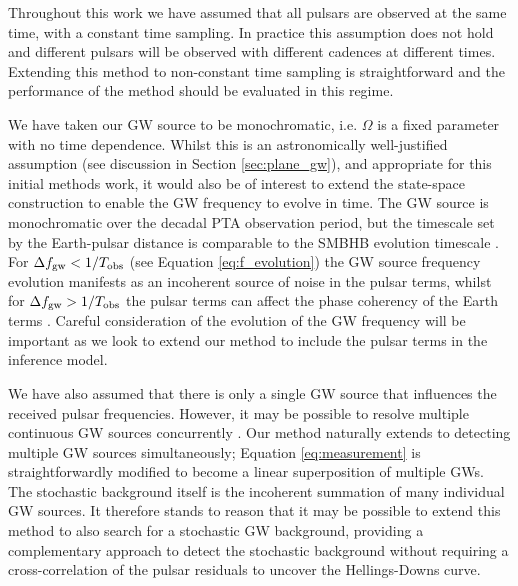 \documentclass[fleqn,usenatbib,useAMS]{mnras}
\begin{document}
Throughout this work we have assumed that all pulsars are observed at the same time, with a constant time sampling. In practice this assumption does not hold and different pulsars will be observed with different cadences at different times. Extending this method to non-constant time sampling is straightforward and the performance of the method should be evaluated in this regime. \newline 

We have taken our GW source to be monochromatic, i.e. $\Omega$ is a fixed parameter with no time dependence. Whilst this is an astronomically well-justified assumption (see discussion in Section \ref{sec:plane_gw}), and appropriate for this initial methods work, it would also be of interest to extend the state-space construction to enable the GW frequency to evolve in time. The GW source is monochromatic over the decadal PTA observation period, but the timescale set by the Earth-pulsar distance is comparable to the SMBHB evolution timescale \citep{Sesana2010}. For $\Delta f_{\rm gw} < 1 / T_{\rm obs}$ (see Equation \eqref{eq:f_evolution}) the GW source frequency evolution manifests as an incoherent source of noise in the pulsar terms, whilst for  $\Delta f_{\rm gw} > 1 / T_{\rm obs}$ the pulsar terms can affect the phase coherency of the Earth terms \citep{Perrodin2018}. Careful consideration of the evolution of the GW frequency will be important as we look to extend our method to include the pulsar terms in the inference model. \newline 

We have also assumed that there is only a single GW source that influences the received pulsar frequencies. However, it may be possible to resolve multiple continuous GW sources concurrently \citep{PhysRevD.85.044034}. Our method naturally extends to detecting multiple GW sources simultaneously; Equation \eqref{eq:measurement} is straightforwardly modified to become a linear superposition of multiple GWs. The stochastic background itself is the incoherent summation of many individual GW sources. It therefore stands to reason that it may be possible to extend this method to also search for a stochastic GW background, providing a complementary approach to detect the stochastic background without requiring a cross-correlation of the pulsar residuals to uncover the Hellings-Downs curve. \newline 
\end{document}
